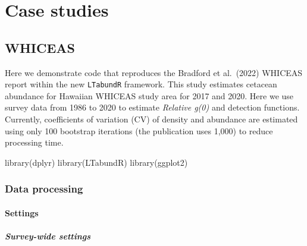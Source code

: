 \documentclass[
]{book}
\newenvironment{Shaded}{\begin{snugshade}}{\end{snugshade}}
\newcommand{\FunctionTok}[1]{\textcolor[rgb]{0.00,0.00,0.00}{#1}}
\newcommand{\NormalTok}[1]{#1}
\begin{document}
\hypertarget{part-case-studies}{%
\part{Case studies}\label{part-case-studies}}

\hypertarget{whiceas}{%
\chapter{WHICEAS}\label{whiceas}}

Here we demonstrate code that reproduces the Bradford et al.~(2022) WHICEAS report within the new \texttt{LTabundR} framework. This study estimates cetacean abundance for Hawaiian WHICEAS study area for 2017 and 2020. Here we use survey data from 1986 to 2020 to estimate \emph{Relative g(0)} and detection functions. Currently, coefficients of variation (CV) of density and abundance are estimated using only 100 bootstrap iterations (the publication uses 1,000) to reduce processing time.

\begin{Shaded}
\begin{Highlighting}[]
\FunctionTok{library}\NormalTok{(dplyr)}
\FunctionTok{library}\NormalTok{(LTabundR)}
\FunctionTok{library}\NormalTok{(ggplot2)}
\end{Highlighting}
\end{Shaded}

\hypertarget{data-processing}{%
\section*{Data processing}\label{data-processing}}

\hypertarget{settings-1}{%
\subsection*{Settings}\label{settings-1}}

\hypertarget{survey-wide-settings-2}{%
\subsubsection*{Survey-wide settings}\label{survey-wide-settings-2}}
\end{document}
